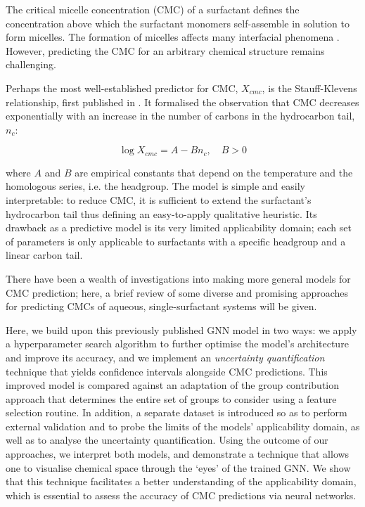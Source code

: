 The critical micelle concentration (CMC) of a surfactant defines the
concentration above which the surfactant monomers self-assemble in solution to
form micelles. The formation of micelles affects many interfacial phenomena
\cite{rosenSurfactantsInterfacialPhenomena2012}. However, predicting the CMC for
an arbitrary chemical structure remains challenging.

Perhaps the most well-established predictor for CMC, $X_{cmc}$, is the
Stauff-Klevens relationship, first published in
\citeyear{klevensStructureAggregationDilate1953}
\cite{klevensStructureAggregationDilate1953}. It formalised the observation that
CMC decreases exponentially with an increase in the number of carbons in the
hydrocarbon tail, $n_c$:

\begin{equation}
    \label{eq:klevens}
    \log X_{cmc} = A - Bn_c, \quad B > 0
\end{equation}

where $A$ and $B$ are empirical constants that depend on the temperature and the
homologous series, i.e. the headgroup. The model is simple and easily
interpretable: to reduce CMC, it is sufficient to extend the surfactant's
hydrocarbon tail thus defining an easy-to-apply qualitative heuristic. Its
drawback as a predictive model is its very limited applicability domain; each
set of parameters is only applicable to surfactants with a specific headgroup
and a linear carbon tail.

There have been a wealth of investigations into making more general models for
CMC prediction; here, a brief review of some diverse and promising approaches
for predicting CMCs of aqueous, single-surfactant systems will be given.



Here, we build upon this previously published GNN model
\cite{qinPredictingCriticalMicelle2021} in two ways: we apply a hyperparameter
search algorithm to further optimise the model's architecture and improve its
accuracy, and we implement an \emph{uncertainty quantification} technique that
yields confidence intervals alongside CMC predictions. This improved model is
compared against an adaptation of the group contribution approach that
determines the entire set of groups to consider using a feature selection
routine. In addition, a separate dataset is introduced so as to perform external
validation and to probe the limits of the models' applicability domain, as well
as to analyse the uncertainty quantification. Using the outcome of our
approaches, we interpret both models, and demonstrate a technique that allows
one to visualise chemical space through the `eyes' of the trained GNN. We show
that this technique facilitates a better understanding of the applicability
domain, which is essential to assess the accuracy of CMC predictions via neural
networks.